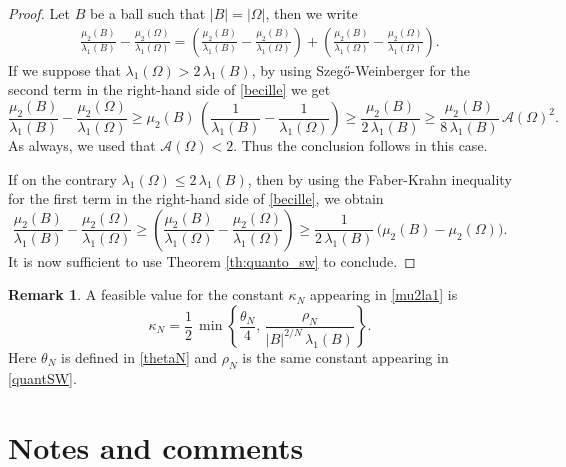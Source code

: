 \documentclass{amsart}
\theoremstyle{definition}
\newtheorem{remark}[lemma]{Remark}
\numberwithin{equation}{section}
\begin{document}
\begin{proof}
Let $B$ be a ball such that $|B|=|\Omega|$, then we write
\begin{equation}
\label{becille}
\begin{split}
\frac{\mu_2(B)}{\lambda_1(B)}-\frac{\mu_2(\Omega)}{\lambda_1(\Omega)}=\left(\frac{\mu_2(B)}{\lambda_1(B)}-\frac{\mu_2(B)}{\lambda_1(\Omega)}\right)+\left(\frac{\mu_2(B)}{\lambda_1(\Omega)}-\frac{\mu_2(\Omega)}{\lambda_1(\Omega)}\right).
\end{split}
\end{equation}
If we suppose that $\lambda_1(\Omega)>2\,\lambda_1(B)$, by using Szeg\H{o}-Weinberger for the second term in the right-hand side of \eqref{becille} we get
\[
\frac{\mu_2(B)}{\lambda_1(B)}-\frac{\mu_2(\Omega)}{\lambda_1(\Omega)}\ge \mu_2(B)\,\left(\frac{1}{\lambda_1(B)}-\frac{1}{\lambda_1(\Omega)}\right)\ge \frac{\mu_2(B)}{2\,\lambda_1(B)}\ge \frac{\mu_2(B)}{8\,\lambda_1(B)}\,\mathcal{A}(\Omega)^2.
\]
As always, we used that $\mathcal{A}(\Omega)<2$. Thus the conclusion follows in this case. 
\par
If on the contrary $\lambda_1(\Omega)\le 2\,\lambda_1(B)$, then by using the Faber-Krahn inequality for the first term in the right-hand side of \eqref{becille}, we obtain
\[
\frac{\mu_2(B)}{\lambda_1(B)}-\frac{\mu_2(\Omega)}{\lambda_1(\Omega)}\ge \left(\frac{\mu_2(B)}{\lambda_1(\Omega)}-\frac{\mu_2(\Omega)}{\lambda_1(\Omega)}\right)\ge \frac{1}{2\,\lambda_1(B)}\,\Big(\mu_2(B)-\mu_2(\Omega)\Big).
\]
It is now sufficient to use Theorem \ref{th:quanto_sw} to conclude. 
\end{proof}

\begin{remark}
A feasible value for the constant $\kappa_N$ appearing in \eqref{mu2la1} is 
\[
\kappa_N=\frac{1}{2}\,\min\left\{\frac{\theta_N}{4},\, \frac{\rho_N}{|B|^{2/N}\,\lambda_1(B)}\right\}.
\]
Here $\theta_N$ is defined in \eqref{thetaN} and $\rho_N$ is the same constant appearing in \eqref{quantSW}.
\end{remark}

\section{Notes and comments}
\label{sec:7}
\end{document}
